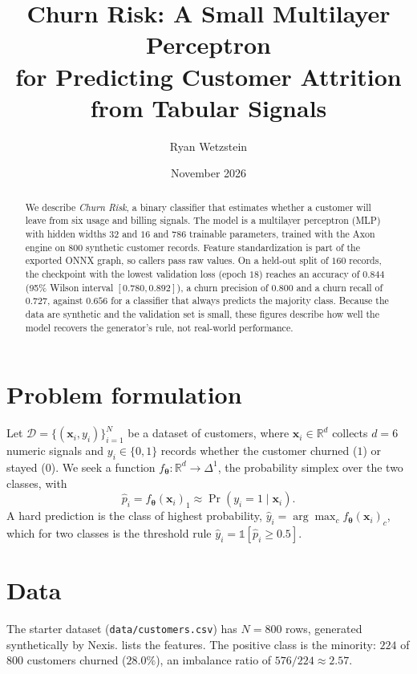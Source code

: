 \documentclass[11pt]{article}
\title{Churn Risk: A Small Multilayer Perceptron\\for Predicting Customer Attrition from Tabular Signals}
\author{Ryan Wetzstein}
\date{November 2026}
\newcommand{\R}{\mathbb{R}}
\newcommand{\code}[1]{\texttt{#1}}
\begin{document}
\maketitle

\begin{abstract}
We describe \emph{Churn Risk}, a binary classifier that estimates whether a
customer will leave from six usage and billing signals. The model is a
multilayer perceptron (MLP) with hidden widths $32$ and $16$ and $786$
trainable parameters, trained with the Axon engine on $800$ synthetic customer
records. Feature standardization is part of the exported ONNX graph, so callers
pass raw values. On a held-out split of $160$ records, the checkpoint with the
lowest validation loss (epoch $18$) reaches an accuracy of $0.844$ (95\% Wilson
interval $[0.780, 0.892]$), a churn precision of $0.800$ and a churn recall of
$0.727$, against $0.656$ for a classifier that always predicts the majority
class. Because the data are synthetic and the validation set is small, these
figures describe how well the model recovers the generator's rule, not
real-world performance.
\end{abstract}

\section{Problem formulation}\label{sec:problem}

Let $\mathcal{D} = \{(\bm{x}_i, y_i)\}_{i=1}^{N}$ be a dataset of customers,
where $\bm{x}_i \in \R^{d}$ collects $d = 6$ numeric signals and
$y_i \in \{0, 1\}$ records whether the customer churned ($1$) or stayed ($0$).
We seek a function $f_{\bm\theta}: \R^{d} \to \Delta^{1}$, the probability
simplex over the two classes, with
\begin{equation}
  \hat{p}_i = f_{\bm\theta}(\bm{x}_i)_1 \approx \Pr(y_i = 1 \mid \bm{x}_i).
\end{equation}
A hard prediction is the class of highest probability,
$\hat{y}_i = \arg\max_{c} f_{\bm\theta}(\bm{x}_i)_c$, which for two classes is the
threshold rule $\hat{y}_i = \mathbb{1}[\hat{p}_i \ge 0.5]$.

\section{Data}\label{sec:data}

The starter dataset (\code{data/customers.csv}) has $N = 800$ rows, generated
synthetically by Nexis.  lists the features. The positive
class is the minority: $224$ of $800$ customers churned ($28.0\%$), an imbalance
ratio of $576/224 \approx 2.57$.
\end{document}
